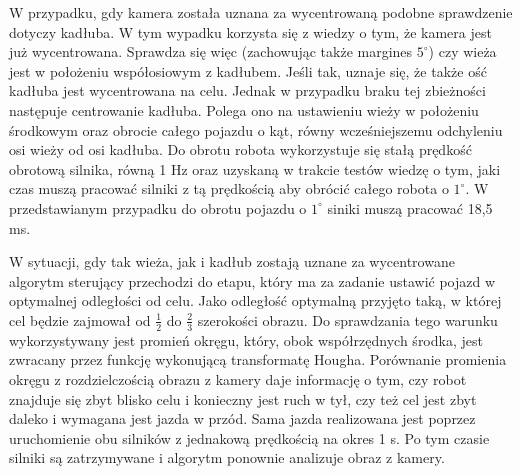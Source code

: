 W przypadku, gdy kamera została uznana za wycentrowaną podobne sprawdzenie dotyczy kadłuba. W tym wypadku korzysta się z wiedzy o tym, że kamera jest już wycentrowana. Sprawdza się więc (zachowując także margines $5^\circ$) czy wieża jest w położeniu współosiowym z kadłubem. Jeśli tak, uznaje się, że także ość kadłuba jest wycentrowana na celu. Jednak w przypadku braku tej zbieżności następuje centrowanie kadłuba. Polega ono na ustawieniu wieży w położeniu środkowym oraz obrocie całego pojazdu o kąt, równy wcześniejszemu odchyleniu osi wieży od osi kadłuba. Do obrotu robota wykorzystuje się stałą prędkość obrotową silnika, równą 1 Hz oraz uzyskaną w trakcie testów wiedzę o tym, jaki czas muszą pracować silniki z tą prędkością aby obrócić całego robota o $1^\circ$. W przedstawianym przypadku do obrotu pojazdu o $1^\circ$ siniki muszą pracować 18,5 ms.

W sytuacji, gdy tak wieża, jak i kadłub zostają uznane za wycentrowane algorytm sterujący przechodzi do etapu, który ma za zadanie ustawić pojazd w optymalnej odległości od celu. Jako odległość optymalną przyjęto taką, w której cel będzie zajmował od $\frac{1}{2}$ do $\frac{2}{3}$ szerokości obrazu. Do sprawdzania tego warunku wykorzystywany jest promień okręgu, który, obok współrzędnych środka, jest zwracany przez funkcję wykonującą transformatę Hougha. Porównanie promienia okręgu z rozdzielczością obrazu z kamery daje informację o tym, czy robot znajduje się zbyt blisko celu i konieczny jest ruch w tył, czy też cel jest zbyt daleko i wymagana jest jazda w przód. Sama jazda realizowana jest poprzez uruchomienie obu silników z jednakową prędkością na okres 1 s. Po tym czasie silniki są zatrzymywane i algorytm ponownie analizuje obraz z kamery.

















    
